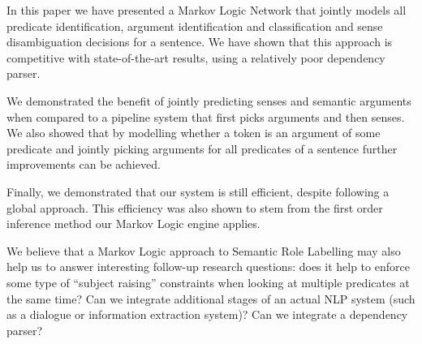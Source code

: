 In this paper we have presented a Markov Logic Network that jointly
models all predicate identification, argument identification and
classification and sense disambiguation decisions for a sentence. We
have shown that this approach is competitive with state-of-the-art
results, using a relatively poor dependency parser. 

We demonstrated the
benefit of jointly predicting senses and semantic arguments when
compared to a pipeline system that first picks arguments and then
senses. We also showed that by modelling whether a token is an
argument of some predicate and jointly picking arguments for all
predicates of a sentence further improvements can be achieved.  

Finally, we demonstrated that our system is still efficient, despite
following a global approach. This efficiency was also shown to stem
from the first order inference method our Markov Logic engine
applies. 

We believe that a Markov Logic approach to Semantic Role Labelling may
also help us to answer interesting follow-up research questions: does it help to
enforce some type of ``subject raising'' constraints when looking at
multiple predicates at the same time? Can we integrate additional
stages of an actual NLP system (such as a dialogue or information
extraction system)? Can we integrate a dependency parser?     
